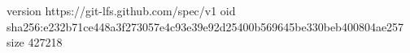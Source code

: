 version https://git-lfs.github.com/spec/v1
oid sha256:e232b71ce448a3f273057e4c93e39e92d25400b569645be330beb400804ae257
size 427218
